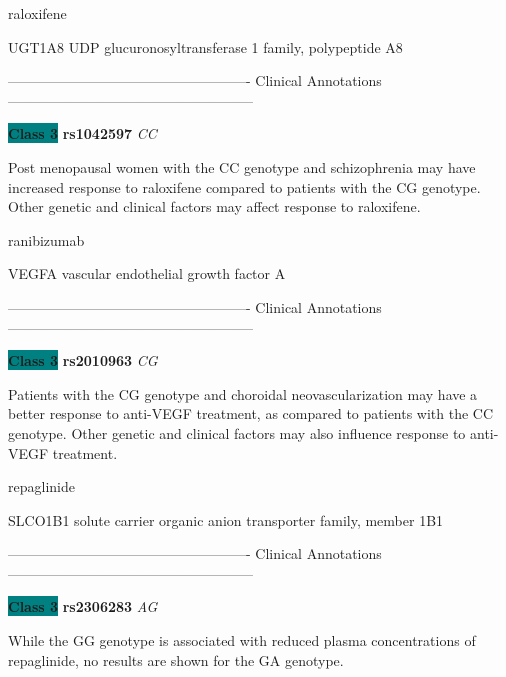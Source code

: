 \documentclass{resume} %
\begin{document}
\begin{rSection}{ raloxifene }
\begin{rSubsection}{ UGT1A8 }{ UDP glucuronosyltransferase 1 family, polypeptide A8 }{}{}
\item[] ---------------------------------------------------- Clinical Annotations -----------------------------------------------------\newline
\item \textbf{\colorbox{teal} {Class 3}} \textbf{ rs1042597 } \textit{ CC }
\item[] Post menopausal women with the CC genotype and schizophrenia may have increased response to raloxifene compared to patients with the CG genotype. Other genetic and clinical factors may affect response to raloxifene. 
\end{rSubsection}

\end{rSection}\begin{rSection}{ ranibizumab }
\item[]

\begin{rSubsection}{ VEGFA }{ vascular endothelial growth factor A }{}{}
\item[]

\item[] ---------------------------------------------------- Clinical Annotations -----------------------------------------------------\newline
\item \textbf{\colorbox{teal} {Class 3}} \textbf{ rs2010963 } \textit{ CG }
\item[] Patients with the CG genotype and choroidal neovascularization may have a better response to anti-VEGF treatment, as compared to patients with the CC genotype. Other genetic and clinical factors may also influence response to anti-VEGF treatment. 
\end{rSubsection}

\end{rSection}\begin{rSection}{ repaglinide }
\item[]

\begin{rSubsection}{ SLCO1B1 }{ solute carrier organic anion transporter family, member 1B1 }{}{}
\item[]

\item[] ---------------------------------------------------- Clinical Annotations -----------------------------------------------------\newline
\item \textbf{\colorbox{teal} {Class 3}} \textbf{ rs2306283 } \textit{ AG }
\item[] While the GG genotype is associated with reduced plasma concentrations of repaglinide, no results are shown for the GA genotype.
\end{rSubsection}


\end{rSection}
\end{document}
